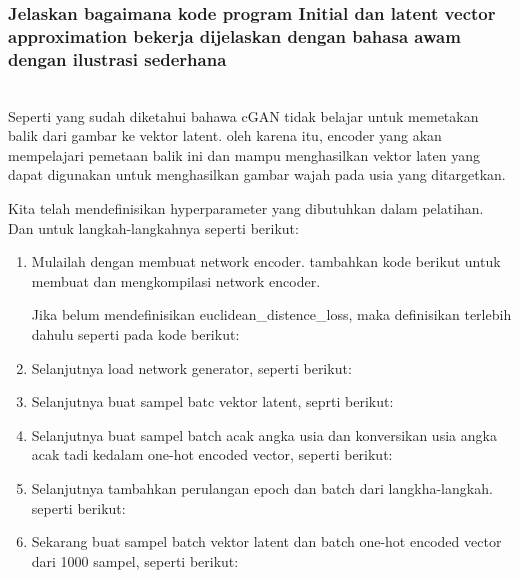 \subsubsection{Jelaskan bagaimana kode program Initial dan latent vector approximation bekerja dijelaskan dengan bahasa awam dengan ilustrasi sederhana}
\hfill\\
Seperti yang sudah diketahui bahawa cGAN tidak belajar untuk memetakan balik dari gambar ke vektor latent. oleh karena itu, encoder yang akan mempelajari pemetaan balik ini dan mampu menghasilkan vektor laten yang dapat digunakan untuk menghasilkan gambar wajah pada usia yang ditargetkan. 

Kita telah mendefinisikan hyperparameter yang dibutuhkan dalam pelatihan. Dan untuk langkah-langkahnya seperti berikut:

\begin{enumerate}
\item Mulailah dengan membuat network encoder. tambahkan kode berikut untuk membuat dan mengkompilasi network encoder.

Jika belum mendefinisikan euclidean\_distence\_loss, maka definisikan terlebih dahulu seperti pada kode berikut:


\item Selanjutnya load network generator, seperti berikut:


\item Selanjutnya buat sampel batc vektor latent, seprti berikut:


\item Selanjutnya buat sampel batch acak angka usia dan konversikan usia angka acak tadi kedalam one-hot encoded vector, seperti berikut:


\item Selanjutnya tambahkan perulangan epoch dan batch dari langkha-langkah. seperti berikut:


\item Sekarang buat sampel batch vektor latent dan batch one-hot encoded vector dari 1000 sampel, seperti berikut:



\end{enumerate}
